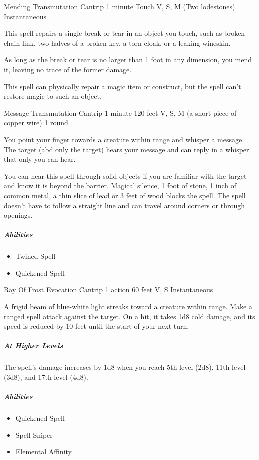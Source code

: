 \documentclass[a4paper,openany,twocolumn]{book}
\begin{document}
\DndSpellHeader
  {Mending}
  {Transmutation Cantrip}
  {1 minute}
  {Touch}
  {V, S, M (Two lodestones)}
  {Instantaneous}

This spell repairs a single break or tear in an object you touch, such as broken chain link, two halves of a broken key, a torn cloak, or a leaking wineskin.
    
As long as the break or tear is no larger than 1 foot in any dimension, you mend it, leaving no trace of the former damage.
    
This spell can physically repair a magic item or construct, but the spell can't restore magic to such an object.
    
\DndSpellHeader
  {Message}
  {Transmutation Cantrip}
  {1 minute}
  {120 feet}
  {V, S, M (a short piece of copper wire)}
  {1 round}

  You point your finger towards a creature within range and whisper a message. The target (abd only the target) hears your message and can reply in a whisper that only you can hear.

  You can hear this spell through solid objects if you are familiar with the target and know it is beyond the barrier. Magical silence, 1 foot of stone, 1 inch of common metal, a thin slice of lead or 3 feet of wood blocks the spell. The spell doesn't have to follow a straight line and can travel around corners or through openings.

\subparagraph*{Abilities}
\begin{itemize}
  \item Twined Spell
  \item Quickened Spell
\end{itemize}

\DndSpellHeader
  {Ray Of Frost}
  {Evocation Cantrip}
  {1 action}
  {60 feet}
  {V, S}
  {Instantaneous}

A frigid beam of blue-white light streaks toward a creature within range. Make a ranged spell attack against the target. On a hit, it takes 1d8 cold damage, and its speed is reduced by 10 feet until the start of your next turn.
    
\subparagraph*{At Higher Levels} The spell's damage increases by 1d8 when you reach 5th level (2d8), 11th level (3d8), and 17th level (4d8).

\subparagraph*{Abilities}
\begin{itemize}
  \item Quickened Spell
  \item Spell Sniper
  \item Elemental Affinity
\end{itemize}
\end{document}
